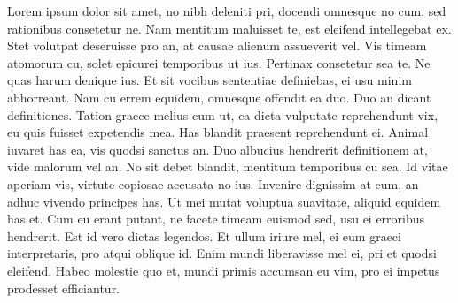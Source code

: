 \def\abstractpage{\cleardoublepage
\begin{center}{\large{\bf \@title} \\
by \\
\@author \\[\baselineskip]}
\par
\def\baselinestretch{1}\@normalsize
Submitted to the \@department, \\
\@school \\
on \@thesisdate, in partial fulfillment of the \\
requirements for the \@degreeword\ of \\
\@degree
\end{center}
\par
\begin{abstract}}

Lorem ipsum dolor sit amet, no nibh deleniti pri, docendi omnesque no cum, sed rationibus consetetur ne. Nam mentitum maluisset te, est eleifend intellegebat ex. Stet volutpat deseruisse pro an, at causae alienum assueverit vel. Vis timeam atomorum cu, solet epicurei temporibus ut ius. Pertinax consetetur sea te. Ne quas harum denique ius. Et sit vocibus sententiae definiebas, ei usu minim abhorreant. Nam cu errem equidem, omnesque offendit ea duo. Duo an dicant definitiones. Tation graece melius cum ut, ea dicta vulputate reprehendunt vix, eu quis fuisset expetendis mea. Has blandit praesent reprehendunt ei. Animal iuvaret has ea, vis quodsi sanctus an. Duo albucius hendrerit definitionem at, vide malorum vel an. No sit debet blandit, mentitum temporibus cu sea. Id vitae aperiam vis, virtute copiosae accusata no ius. Invenire dignissim at cum, an adhuc vivendo principes has. Ut mei mutat voluptua suavitate, aliquid equidem has et. Cum eu erant putant, ne facete timeam euismod sed, usu ei erroribus hendrerit. Est id vero dictas legendos. Et ullum iriure mel, ei eum graeci interpretaris, pro atqui oblique id. Enim mundi liberavisse mel ei, pri et quodsi eleifend. Habeo molestie quo et, mundi primis accumsan eu vim, pro ei impetus prodesset efficiantur.